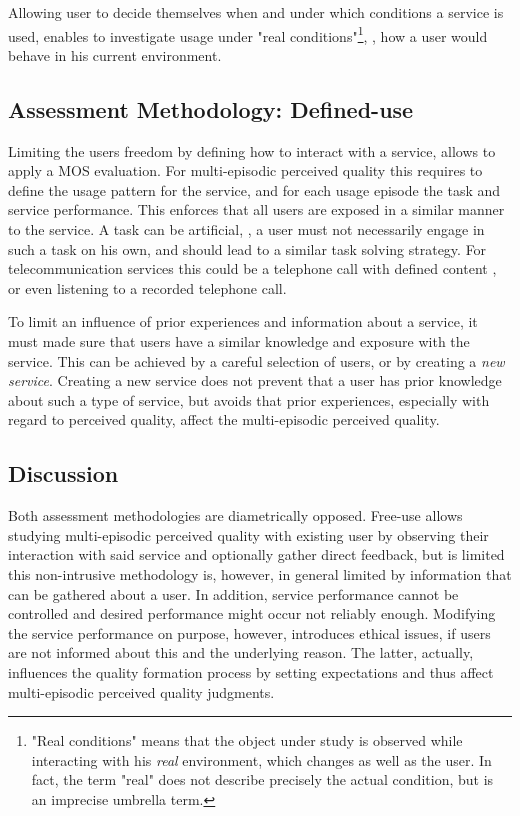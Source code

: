 Allowing user to decide themselves when and under which conditions a service is used, enables to investigate usage under "real conditions"\footnote{"Real conditions" means that the object under study is observed while interacting with his \emph{real} environment, which changes as well as the user. In fact, the term "real" does not describe precisely the actual condition, but is an imprecise umbrella term.}, \ie, how a user would behave in his current environment.

\subsection{Assessment Methodology: Defined-use}
Limiting the users freedom by defining how to interact with a service, allows to apply a \ac{MOS} evaluation.
For multi-episodic perceived quality this requires to define the usage pattern for the service, and for each usage episode the task and service performance.
This enforces that all users are exposed in a similar manner to the service.
A task can be artificial, \ie, a user must not necessarily engage in such a task on his own, and should lead to a similar task solving strategy.
For telecommunication services this could be a telephone call with defined content \citep[\cf][]{itu-t_p.805:_2007}, or even listening to a recorded telephone call.

To limit an influence of prior experiences and information about a service, it must made sure that users have a similar knowledge and exposure with the service.
This can be achieved by a careful selection of users, or by creating a \emph{new service}.
Creating a new service does not prevent that a user has prior knowledge about such a type of service, but avoids that prior experiences, especially with regard to perceived quality, affect the multi-episodic perceived quality.

\subsection{Discussion}
Both assessment methodologies are diametrically opposed. 
Free-use allows studying multi-episodic perceived quality with existing user by observing their interaction with said service and optionally gather direct feedback, but is limited this non-intrusive methodology is, however, in general limited by information that can be gathered about a user.
In addition, service performance cannot be controlled and desired performance might occur not reliably enough.
Modifying the service performance on purpose, however, introduces ethical issues, if users are not informed about this and the underlying reason.
The latter, actually, influences the quality formation process by setting expectations and thus affect multi-episodic perceived quality judgments.

